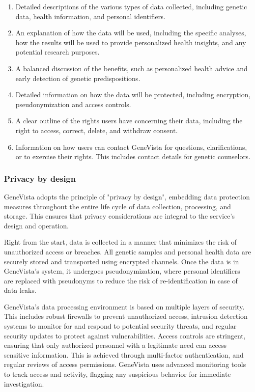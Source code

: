 \documentclass[a4paper]{article}
\begin{document}
\begin{enumerate}
    \item Detailed descriptions of the various types of data collected, including genetic data, health information, and personal identifiers.
    \item An explanation of how the data will be used, including the specific analyses, how the results will be used to provide personalized health insights, and any potential research purposes.
    \item A balanced discussion of the benefits, such as personalized health advice and early detection of genetic predispositions.
    \item Detailed information on how the data will be protected, including encryption, pseudonymization and access controls.
    \item A clear outline of the rights users have concerning their data, including the right to access, correct, delete, and withdraw consent.
    \item Information on how users can contact GeneVista for questions, clarifications, or to exercise their rights. This includes contact details for genetic counselors.
\end{enumerate}

\subsubsection{Privacy by design}

GeneVista adopts the principle of "privacy by design", embedding data protection measures throughout the entire life cycle of data collection, processing, and storage. This ensures that privacy considerations are integral to the service's design and operation.

Right from the start, data is collected in a manner that minimizes the risk of unauthorized access or breaches. All genetic samples and personal health data are securely stored and transported using encrypted channels. Once the data is in GeneVista's system, it undergoes pseudonymization, where personal identifiers are replaced with pseudonyms to reduce the risk of re-identification in case of data leaks.

GeneVista's data processing environment is based on multiple layers of security. This includes robust firewalls to prevent unauthorized access, intrusion detection systems to monitor for and respond to potential security threats, and regular security updates to protect against vulnerabilities. Access controls are stringent, ensuring that only authorized personnel with a legitimate need can access sensitive information. This is achieved through multi-factor authentication, and regular reviews of access permissions. GeneVista uses advanced monitoring tools to track access and activity, flagging any suspicious behavior for immediate investigation.
\end{document}
